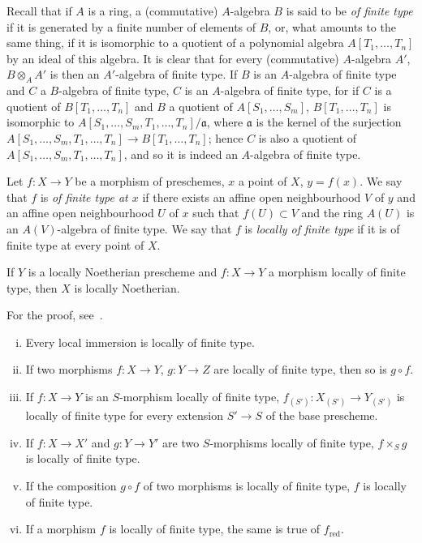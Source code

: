 \begin{env}[1.3.1]
\label{IV.1.3.1}
Recall that if $A$ is a ring, a (commutative) $A$-algebra $B$ is
said to be \emph{of finite type} if it is generated by a finite number of elements of $B$, or, what amounts to
the same thing, if it is isomorphic to a quotient of a polynomial algebra $A[T_1,\ldots,T_n]$
by an ideal of this algebra. It is clear that for every (commutative) $A$-algebra $A'$,
$B\otimes_A A'$ is then an $A'$-algebra of finite type. If $B$ is an $A$-algebra of finite type and $C$
a $B$-algebra of finite type, $C$ is an $A$-algebra of finite type, for if $C$ is a quotient
of $B[T_1,\ldots,T_n]$ and $B$ a quotient of $A[S_1,\ldots,S_m]$, $B[T_1,\ldots,T_n]$ is isomorphic to $A[S_1,\ldots,S_m,T_1,\ldots,T_n]/\mathfrak{a}$,
where $\mathfrak{a}$ is the kernel of the surjection $A[S_1,\ldots,S_m,T_1,\ldots,T_n]\to B[T_1,\ldots,T_n]$; hence $C$ is also a quotient of
$A[S_1,\ldots,S_m,T_1,\ldots,T_n]$, and so it is indeed an $A$-algebra of finite type.
\end{env}

\begin{definition}[1.3.2]
\label{IV.1.3.2}
Let $f:X\to Y$ be a morphism of preschemes, $x$ a point of $X$,
$y=f(x)$. We say that $f$ is \emph{of finite type at $x$} if there exists an affine open neighbourhood $V$ of $y$ and an affine open
neighbourhood $U$ of $x$ such that $f(U)\subset V$ and the ring $A(U)$ is an $A(V)$-algebra of finite type.
We say that $f$ is \emph{locally of finite type} if it is of finite type at every point of $X$.
\end{definition}


\begin{proposition}[1.3.3]
\label{IV.1.3.3}
If $Y$ is a locally Noetherian prescheme and $f:X\to Y$ a
morphism locally of finite type, then $X$ is locally Noetherian.
\end{proposition}

For the proof, see~.

\begin{proposition}[1.3.4]
\label{IV.1.3.4}
\medskip\noindent
\begin{enumerate}[(i)]
  \item Every local immersion is locally of finite type.
  \item If two morphisms $f:X\to Y$, $g:Y\to Z$ are locally of finite type, then so is $g\circ f$.
  \item If $f:X\to Y$ is an $S$-morphism locally of finite type, $f_{(S')}:X_{(S')}\to Y_{(S')}$ is
    locally of finite type for every extension $S'\to S$ of the base prescheme.
  \item If $f:X\to X'$ and $g:Y\to Y'$ are two $S$-morphisms locally of finite type, $f\times_S g$
    is locally of finite type.
  \item If the composition $g\circ f$ of two morphisms is locally of finite type, $f$ is locally of
    finite type.
  \item If a morphism $f$ is locally of finite type, the same is true of $f_{\mathrm{red}}$.
\end{enumerate}
\end{proposition}

